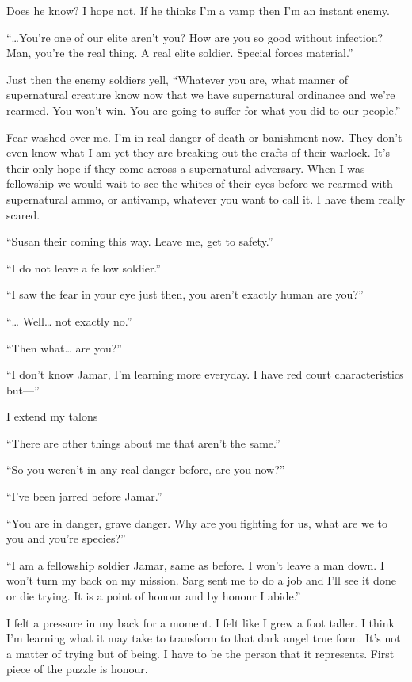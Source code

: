 Does he know? I hope not. If he thinks I'm a vamp then I'm an instant enemy.

``\dots{}You're one of our elite aren't you? How are you so good without infection? Man, you're the real thing. A real elite soldier. Special forces material.''

Just then the enemy soldiers yell, ``Whatever you are, what manner of supernatural creature know now that we have supernatural ordinance and we're rearmed. You won't win. You are going to suffer for what you did to our people.''

Fear washed over me. I'm in real danger of death or banishment now. They don't even know what I am yet they are breaking out the crafts of their warlock. It's their only hope if they come across a supernatural adversary. When I was fellowship we would wait to see the whites of their eyes before we rearmed with supernatural ammo, or antivamp, whatever you want to call it. I have them really scared.

``Susan their coming this way. Leave me, get to safety.''

``I do not leave a fellow soldier.''

``I saw the fear in your eye just then, you aren't exactly human are you?''

``\dots{} Well\dots{} not exactly no.''

``Then what\dots{} are you?''

``I don't know Jamar, I'm learning more everyday. I have red court characteristics but---''

I extend my talons

``There are other things about me that aren't the same.''

``So you weren't in any real danger before, are you now?''

``I've been jarred before Jamar.''

``You are in danger, grave danger. Why are you fighting for us, what are we to you and you're species?''

``I am a fellowship soldier Jamar, same as before. I won't leave a man down. I won't turn my back on my mission. Sarg sent me to do a job and I'll see it done or die trying. It is a point of honour and by honour I abide.''

I felt a pressure in my back for a moment. I felt like I grew a foot taller. I think I'm learning what it may take to transform to that dark angel true form. It's not a matter of trying but of being. I have to be the person that it represents. First piece of the puzzle is honour.

